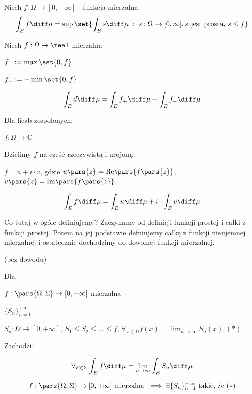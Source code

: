 \begin{definition}
	Niech \( f: \Omega\to [0, +\infty] \) - funkcja mierzalna.
	\[
		\int_E f \diff \mu = \sup \set{\int_E s \diff \mu \; : \; s: \Omega\to [0, \infty], s \text{ jest prosta, } s \leq f }
	\]
\end{definition}

\begin{definition}
	Niech  \( f: \Omega\to \real \) mierzalna

	\( f_+ := \max \set{0, f} \)

	\( f_- := -\min \set{0, f} \)

	\[
		\int_E d \diff \mu = \int_E f_+ \diff \mu - \int_E f_- \diff \mu
	\]
\end{definition}

\begin{definition}
	Dla liczb zespolonych:

	\( f: \Omega\to \mathbb{C} \)

	Dzielimy \( f \) na część rzeczywistą i urojoną:

	\( f = u + i \cdot v \), gdzie \( u\pars{ z } = \text{Re}\pars{ f\pars{ z } } \), \( v\pars{ z } = \text{Im}\pars{ f\pars{ z } } \)

	\[
		\int_E f \diff \mu = \int_E u \diff \mu + i \cdot \int_E v \diff \mu
	\]
\end{definition}

Co tutaj w ogóle definiujemy? Zaczynamy od definicji funkcji prostej i całki z funkcji prostej. Potem na jej podstawie defniujemy całkę z funkcji nieujemnej mierzalnej i ostatecznie dochodzimy do dowolnej funkcji mierzalnej.

\begin{theorem} (bez dowodu)

	Dla:

	\( f: \pars{ \Omega, \Sigma } \to [0, +\infty] \) mierzalna

	\( \{S_n\}_{n = 1}^{+\infty} \)

	\( S_n : \Omega \to [0, +\infty] \), \( S_1 \leq S_2 \leq \ldots \leq f \), \( \forall_{x \in \Omega} f(x) = \lim_{n \to \infty} S_n(x) \) \hfill \( (*) \)

	Zachodzi:

	\[
		\forall_{E \in \Sigma} \int_E f \diff \mu = \lim_{n \to \infty} \int_E S_n \diff \mu
	\]
\end{theorem}

\begin{theorem}
	\[
		f : \pars{ \Omega, \Sigma } \to [0, +\infty] \text{ mierzalna } \implies \exists \{S_n\}_{n = 1}^{+\infty} \text{ takie, że } (*)
	\]
\end{theorem}

